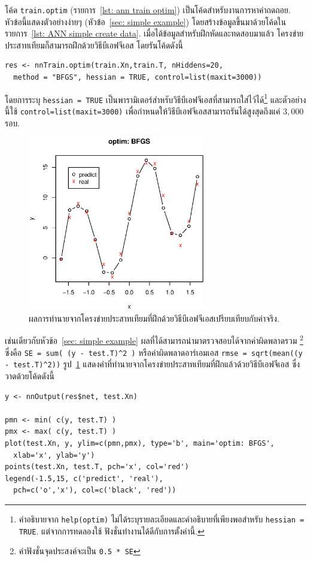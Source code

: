 โค้ด \texttt{train.optim} (รายการ~\ref{lst: ann train optim}) เป็นโค้ดสำหรับงานการหาค่าถดถอย.
หัวข้อนี้แสดงตัวอย่างง่ายๆ (หัวข้อ~\ref{sec: simple example}) โดยสร้างข้อมูลขึ้นมาด้วยโค้ดในรายการ~\ref{lst: ANN simple create data}.
เมื่อได้ข้อมูลสำหรับฝึกหัดและทดสอบมาแล้ว โครงข่ายประสาทเทียมก็สามารถฝึกด้วยวิธีบีเอฟจีเอส โดยรันโค้ดดังนี้
\begin{verbatim}
res <- nnTrain.optim(train.Xn,train.T, nHiddens=20,
  method = "BFGS", hessian = TRUE, control=list(maxit=3000))
\end{verbatim}
โดยการระบุ \texttt{hessian = TRUE} เป็นพารามิเตอร์สำหรับวิธีบีเอฟจีเอสที่สามารถใส่ไว้ได้\footnote{
คำอธิบายจาก \texttt{help(optim)} ไม่ได้ระบุรายละเอียดและคำอธิบายที่เพียงพอสำหรับ \texttt{hessian = TRUE}.
แต่จากการทดลองใช้ ฟังชั่นทำงานได้ดีกับการตั้งค่านี้.
} และตัวอย่างนี้ใช้ \texttt{control=list(maxit=3000)} เพื่อกำหนดให้วิธีบีเอฟจีเอสสามารถรันได้สูงสุดถึงแค่ $3,000$ รอบ.

%
\begin{figure}
\begin{center}
\includegraphics[height=3in]{04ANNmore/BFGSoutput.eps}
\end{center}
\caption{ผลการทำนายจากโครงข่ายประสาทเทียมที่ฝึกด้วยวิธีบีเอฟจีเอสเปรียบเทียบกับค่าจริง.}
\label{fig: more ann BFGS result}
\end{figure}

เช่นเดียวกับหัวข้อ~\ref{sec: simple example} ผลที่ได้สามารถนำมาตรวจสอบได้จากค่าผิดพลาดรวม%
\footnote{ค่าฟังชั่นจุดประสงค์จะเป็น \texttt{0.5 * SE}} ซึ่งคือ
\verb|SE = sum( (y - test.T)^2 )|
หรือค่าผิดพลาดอาร์เอมเอส \verb|rmse = sqrt(mean((y - test.T)^2))|
รูป~\ref{fig: more ann BFGS result} แสดงค่าที่ทำนายจากโครงข่ายประสาทเทียมที่ฝึกแล้วด้วยวิธีบีเอฟจีเอส ซึ่งวาดด้วยโค้ดดังนี้

\begin{verbatim}
y <- nnOutput(res$net, test.Xn)
  
pmn <- min( c(y, test.T) )
pmx <- max( c(y, test.T) )
plot(test.Xn, y, ylim=c(pmn,pmx), type='b', main='optim: BFGS',
  xlab='x', ylab='y')
points(test.Xn, test.T, pch='x', col='red')
legend(-1.5,15, c('predict', 'real'), 
  pch=c('o','x'), col=c('black', 'red'))
\end{verbatim}

